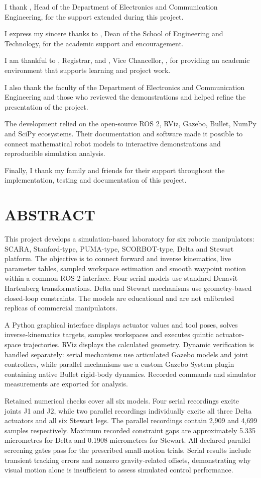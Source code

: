 \documentclass[11pt,a4paper,oneside]{report}
\newcommand{\frontchapter}[1]{\chapter*{#1}\addcontentsline{toc}{chapter}{#1}}
\begin{document}
I thank \textbf{\HODName}, Head of the Department of Electronics and Communication Engineering, for the support extended during this project.

I express my sincere thanks to \textbf{\DeanName}, Dean of the School of Engineering and Technology, for the academic support and encouragement.

I am thankful to \textbf{\RegistrarName}, Registrar, and \textbf{\ViceChancellorName}, Vice Chancellor, \University, for providing an academic environment that supports learning and project work.

I also thank the faculty of the Department of Electronics and Communication Engineering and those who reviewed the demonstrations and helped refine the presentation of the project.

The development relied on the open-source ROS 2, RViz, Gazebo, Bullet, NumPy and SciPy ecosystems. Their documentation and software made it possible to connect mathematical robot models to interactive demonstrations and reproducible simulation analysis.

Finally, I thank my family and friends for their support throughout the implementation, testing and documentation of this project.
\par\vspace{12mm}\hfill\StudentName
\clearpage
\frontchapter{ABSTRACT}
This project develops a simulation-based laboratory for six robotic manipulators: SCARA, Stanford-type, PUMA-type, SCORBOT-type, Delta and Stewart platform. The objective is to connect forward and inverse kinematics, live parameter tables, sampled workspace estimation and smooth waypoint motion within a common ROS 2 interface. Four serial models use standard Denavit--Hartenberg transformations. Delta and Stewart mechanisms use geometry-based closed-loop constraints. The models are educational and are not calibrated replicas of commercial manipulators.

A Python graphical interface displays actuator values and tool poses, solves inverse-kinematics targets, samples workspaces and executes quintic actuator-space trajectories. RViz displays the calculated geometry. Dynamic verification is handled separately: serial mechanisms use articulated Gazebo models and joint controllers, while parallel mechanisms use a custom Gazebo System plugin containing native Bullet rigid-body dynamics. Recorded commands and simulator measurements are exported for analysis.

Retained numerical checks cover all six models. Four serial recordings excite joints J1 and J2, while two parallel recordings individually excite all three Delta actuators and all six Stewart legs. The parallel recordings contain 2,909 and 4,699 samples respectively. Maximum recorded constraint gaps are approximately 5.335 micrometres for Delta and 0.1908 micrometres for Stewart. All declared parallel screening gates pass for the prescribed small-motion trials. Serial results include transient tracking errors and nonzero gravity-related offsets, demonstrating why visual motion alone is insufficient to assess simulated control performance.
\end{document}
